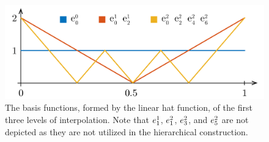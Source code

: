 \begin{figure}
  \centering
  \includegraphics[width=1.0\columnwidth]{include/assets/basis.pdf}
  \caption{
    The basis functions, formed by the linear hat function, of the first three
    levels of interpolation. Note that $e^1_1$, $e^2_1$, $e^2_3$, and
    $e^2_5$ are not depicted as they are not utilized in the hierarchical
    construction.
  }
\end{figure}
